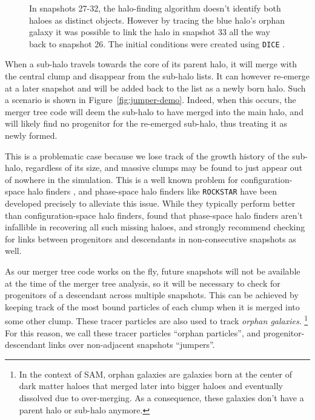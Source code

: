 \documentclass[a4paper,twocolumn,fleqn,usenatbib]{mnras}
\newcommand{\msol}{M_{\sun}}
\begin{document}
\begin{figure}
{        In snapshots 27-32, the halo-finding algorithm doesn't identify both haloes as distinct objects.
        However by tracing the blue halo's orphan galaxy it was possible to link the halo in snapshot 33 all the way back to snapshot 26. \hspace{\textwidth}
        The initial conditions were created using \texttt{DICE} \citep{DICE}.
        }
\end{figure}



When a sub-halo travels towards the core of its parent halo, it will
merge with the central clump and disappear from the sub-halo lists.  It
can however re-emerge at a later snapshot and will be added back
to the list as a newly born halo. Such a scenario is shown in
Figure~\ref{fig:jumper-demo}.  Indeed, when this occurs, the merger
tree code will deem the sub-halo to have merged into the main halo, and
will likely find no progenitor for the re-emerged sub-halo, thus
treating it as newly formed.

This is a problematic case because we lose track of the growth history
of the sub-halo, regardless of its size, and massive clumps may be
found to just appear out of nowhere in the simulation.  This is a well
known problem for configuration-space halo finders
\citep{onionsSubhaloesGoingNotts2012}, and phase-space halo finders
like \texttt{ROCKSTAR} \citep{behrooziRockstarPhaseSpaceTemporal2013}
have been developed precisely to alleviate this issue.  While they
typically perform better than configuration-space halo finders,
\cite{SUSSING_COMPARISON} found that phase-space halo finders aren't
infallible in recovering all such missing haloes, and strongly
recommend checking for links between progenitors and descendants in
non-consecutive snapshots as well.

As our merger tree code works on the fly, future snapshots will not be
available at the time of the merger tree analysis, so it will be
necessary to check for progenitors of a descendant across multiple
snapshots.  This can be achieved by keeping track of the most bound
particles of each clump when it is merged into some other clump.
These tracer particles are also used to track {\it orphan galaxies}.
\footnote{In the context of SAM, orphan galaxies are galaxies born at
the center of dark matter haloes that merged later into bigger haloes
and eventually dissolved due to over-merging. As a consequence, these
galaxies don't have a parent halo or sub-halo anymore.}  For this
reason, we call these tracer particles ``orphan particles'', and
progenitor-descendant links over non-adjacent snapshots ``jumpers''.
\end{document}
